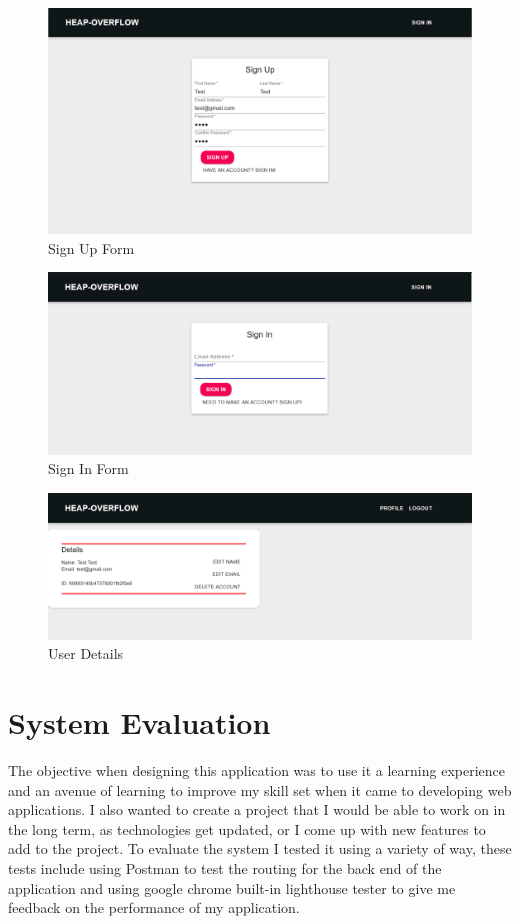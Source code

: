 \begin{figure}
    \centering
    \includegraphics[scale=0.4]{img/UI/signup.png}
    \caption{Sign Up Form}
    \label{fig8.4:signup}
\end{figure}
\begin{figure}
    \centering
    \includegraphics[scale=0.4]{img/UI/signin.png}
    \caption{Sign In Form}
    \label{fig8.5:signin}
\end{figure}

\begin{figure}
    \centering
    \includegraphics[scale=0.4]{img/UI/details.png}
    \caption{User Details}
    \label{fig8.6:details}
\end{figure}


\chapter{System Evaluation}
The objective when designing this application was to use it a learning experience and an avenue of learning to improve my skill set when it came to developing web applications. I also wanted to create a project that I would be able to work on in the long term, as technologies get updated, or I come up with new features to add to the project. To evaluate the system I tested it using a variety of way, these tests include using Postman to test the routing for the back end of the application and using google chrome built-in lighthouse tester to give me feedback on the performance of my application.

